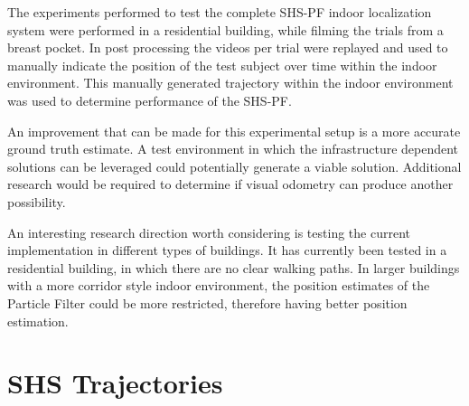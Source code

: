 The experiments performed to test the complete SHS-PF indoor localization system were performed in a residential building, while filming the trials from a breast pocket. In post processing the videos per trial were replayed and used to manually indicate the position of the test subject over time within the indoor environment. This manually generated trajectory within the indoor environment was used to determine performance of the SHS-PF. \par 

An improvement that can be made for this experimental setup is a more accurate ground truth estimate. A test environment in which the infrastructure dependent solutions can be leveraged could potentially generate a viable solution. Additional research would be required to determine if visual odometry can produce another possibility. \par

An interesting research direction worth considering is testing the current implementation in different types of buildings. It has currently been tested in a residential building, in which there are no clear walking paths. In larger buildings with a more corridor style indoor environment, the position estimates of the Particle Filter could be more restricted, therefore having better position estimation.

\chapter{SHS Trajectories}




